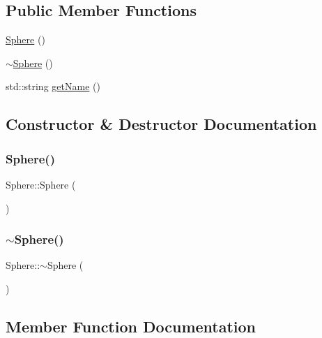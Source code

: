 \subsection*{Public Member Functions}
\begin{DoxyCompactItemize}
\item 
\mbox{\hyperlink{class_sphere_a890a63ff583cb88e7ec4e840b4ef5eb9}{Sphere}} ()
\item 
\mbox{\hyperlink{class_sphere_a569c071e50a3e11f678630ee1a17737e}{$\sim$\+Sphere}} ()
\item 
std\+::string \mbox{\hyperlink{class_sphere_a173e667086ecd8b9d972e1d6f9885d9d}{get\+Name}} ()
\end{DoxyCompactItemize}


\subsection{Constructor \& Destructor Documentation}
\mbox{\label{class_sphere_a890a63ff583cb88e7ec4e840b4ef5eb9}} 
\subsubsection{\texorpdfstring{Sphere()}{Sphere()}}
{\footnotesize\ttfamily Sphere\+::\+Sphere (\begin{DoxyParamCaption}{ }\end{DoxyParamCaption})}

\mbox{\label{class_sphere_a569c071e50a3e11f678630ee1a17737e}} 
\subsubsection{\texorpdfstring{$\sim$Sphere()}{~Sphere()}}
{\footnotesize\ttfamily Sphere\+::$\sim$\+Sphere (\begin{DoxyParamCaption}{ }\end{DoxyParamCaption})}



\subsection{Member Function Documentation}
\mbox{\label{class_sphere_a173e667086ecd8b9d972e1d6f9885d9d}} 
